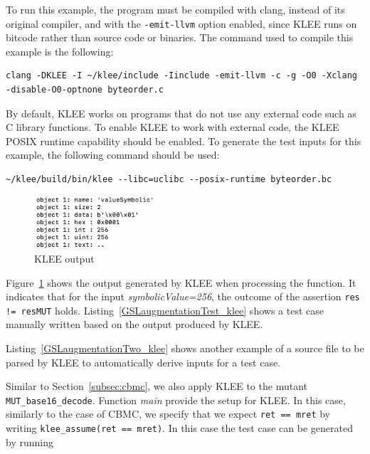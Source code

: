 To run this example, the program must be compiled with clang, instead of its original compiler, and with the \texttt{-emit-llvm} option enabled, since KLEE runs on bitcode rather than source code or binaries. The command used to compile this example is the following:

\begin{verbatim}
clang -DKLEE -I ~/klee/include -Iinclude -emit-llvm -c -g -O0 -Xclang 
-disable-O0-optnone byteorder.c
\end{verbatim}

By default, KLEE works on programs that do not use any external code such as C library functions. To enable KLEE to work with external code, the KLEE POSIX runtime capability should be enabled. To generate the test inputs for this example, the following command should be used:

\begin{verbatim}
~/klee/build/bin/klee --libc=uclibc --posix-runtime byteorder.bc
\end{verbatim}



\begin{figure}[h]
\begin{center}
\includegraphics[width=0.4\textwidth]{images/klee_output_1}
\caption{KLEE output}
\label{fig:klee_output_1}
\end{center}
\end{figure}



Figure~\ref{fig:klee_output_1} shows the output generated by KLEE when processing the function. It indicates that for the input \emph{symbolicValue=256}, the outcome of the assertion \texttt{res != resMUT} holds. Listing~\ref{GSLaugmentationTest_klee} shows a test case manually written based on the output produced by KLEE.



Listing~\ref{GSLaugmentationTwo_klee} shows another example of a source file to be parsed by KLEE to automatically derive inputs for a test case. 

Similar to Section~\ref{subsec:cbmc}, we also apply KLEE to the mutant \texttt{MUT\_base16\_decode}. Function \emph{main} provide the setup for KLEE. In this case, similarly to the case of CBMC, we specify that we expect \texttt{ret == mret} by writing \texttt{klee\_assume(ret == mret)}. In this case the test case can be generated by running

